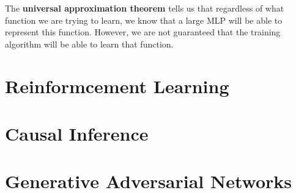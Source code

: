 The \textbf{universal approximation theorem} \cite{HORNIK1989359}
tells us that regardless of what function
we are trying to learn, we know that a large MLP will be able to represent this
function. However, we are not guaranteed that the training algorithm will be able
to learn that function.

\section{Reinformcement Learning}


\section{Causal Inference}

\section{Generative Adversarial Networks}